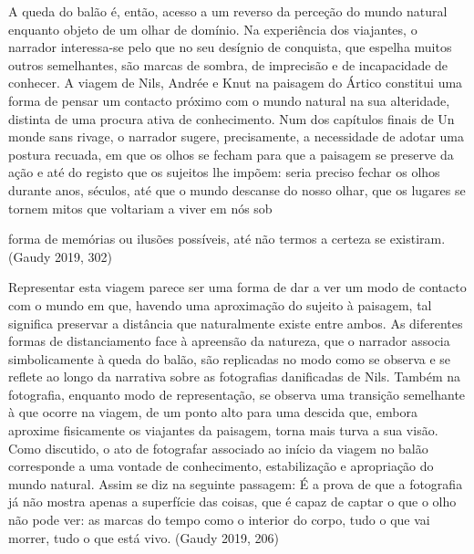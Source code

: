 \documentclass{article}
\begin{document}
A queda do balão é, então, acesso a um reverso da perceção do mundo natural
enquanto objeto de um olhar de domínio. Na experiência dos viajantes, o narrador
interessa-se pelo que no seu desígnio de conquista, que espelha muitos outros semelhantes, são marcas de sombra, de imprecisão e de incapacidade de conhecer. A viagem de Nils, Andrée e Knut na paisagem do Ártico constitui uma forma de pensar
um contacto próximo com o mundo natural na sua alteridade, distinta de uma procura ativa de conhecimento. Num dos capítulos finais de Un monde sans rivage, o
narrador sugere, precisamente, a necessidade de adotar uma postura recuada, em
que os olhos se fecham para que a paisagem se preserve da ação e até do registo que
os sujeitos lhe impõem:
seria preciso fechar os olhos durante anos, séculos, até que o mundo descanse do
nosso olhar, que os lugares se tornem mitos que voltariam a viver em nós sob




forma de memórias ou ilusões possíveis, até não termos a certeza se existiram.
(Gaudy 2019, 302)

Representar esta viagem parece ser uma forma de dar a ver um modo de contacto
com o mundo em que, havendo uma aproximação do sujeito à paisagem, tal significa
preservar a distância que naturalmente existe entre ambos.
As diferentes formas de distanciamento face à apreensão da natureza, que o
narrador associa simbolicamente à queda do balão, são replicadas no modo como se
observa e se reflete ao longo da narrativa sobre as fotografias danificadas de Nils.
Também na fotografia, enquanto modo de representação, se observa uma transição
semelhante à que ocorre na viagem, de um ponto alto para uma descida que, embora
aproxime fisicamente os viajantes da paisagem, torna mais turva a sua visão. Como
discutido, o ato de fotografar associado ao início da viagem no balão corresponde a
uma vontade de conhecimento, estabilização e apropriação do mundo natural. Assim
se diz na seguinte passagem:
É a prova de que a fotografia já não mostra apenas a superfície das coisas, que é
capaz de captar o que o olho não pode ver: as marcas do tempo como o interior do
corpo, tudo o que vai morrer, tudo o que está vivo. (Gaudy 2019, 206)
\end{document}

